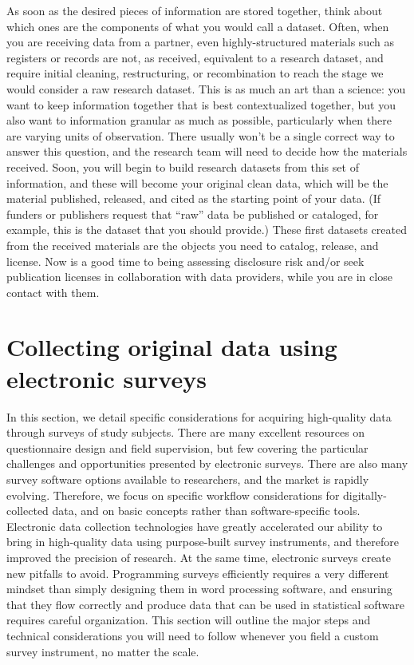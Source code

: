As soon as the desired pieces of information are stored together,
think about which ones are the components of what you would call a dataset.
Often, when you are receiving data from a partner,
even highly-structured materials such as registers or records
are not, as received, equivalent to a research dataset,
and require initial cleaning, restructuring, or recombination
to reach the stage we would consider a raw research dataset.
This is as much an art than a science:
you want to keep information together that is best contextualized together,
but you also want to information granular as much as possible,
particularly when there are varying units of observation.
There usually won't be a single correct way to answer this question,
and the research team will need to decide how the materials received.
Soon, you will begin to build research datasets from this set of information,
and these will become your original clean data,
which will be the material published, released, and cited
as the starting point of your data.
(If funders or publishers request that ``raw'' data be published or cataloged,
for example, this is the dataset that you should provide.)
These first datasets created from the received materials
are the objects you need to catalog, release, and license.
Now is a good time to being assessing disclosure risk
and/or seek publication licenses in collaboration with data providers,
while you are in close contact with them.



\section{Collecting original data using electronic surveys}
In this section, we detail specific considerations
for acquiring high-quality data through surveys of study subjects.
There are many excellent resources on questionnaire design and field supervision,
but few covering the particular challenges and opportunities presented by electronic surveys.
There are also many survey software options available to researchers,
and the market is rapidly evolving.
Therefore, we focus on specific workflow considerations for digitally-collected data,
and on basic concepts rather than software-specific tools.
Electronic data collection technologies
have greatly accelerated our ability to bring in high-quality data
using purpose-built survey instruments,
and therefore improved the precision of research.
At the same time, electronic surveys create new pitfalls to avoid.
Programming surveys efficiently requires a very different mindset
than simply designing them in word processing software,
and ensuring that they flow correctly and produce data
that can be used in statistical software requires careful organization.
This section will outline the major steps and technical considerations
you will need to follow whenever you field a custom survey instrument,
no matter the scale.

